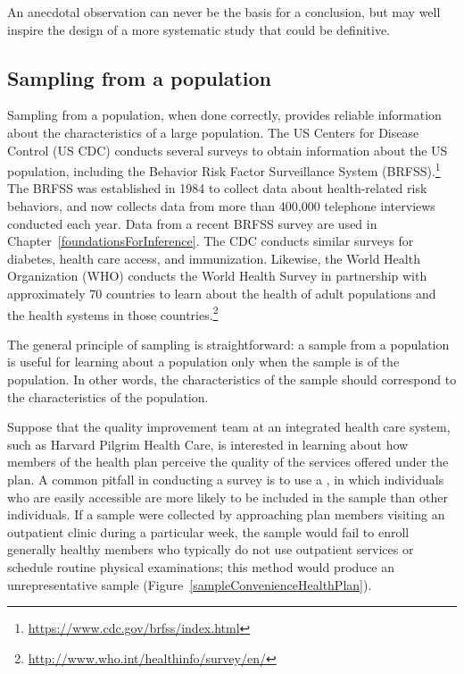 An anecdotal observation can never be the basis for a conclusion, but may well inspire the design of a more systematic study that could be definitive.  


\subsection{Sampling from a population}

Sampling from a population, when done correctly, provides reliable information about the characteristics of a large population. The US Centers for Disease Control (US CDC) conducts several surveys to obtain information about the US population, including the Behavior Risk Factor Surveillance System (BRFSS).\footnote{\url{https://www.cdc.gov/brfss/index.html}} The BRFSS was established in 1984 to collect data about health-related risk behaviors, and now collects data from more than 400,000 telephone interviews conducted each year. Data from a recent BRFSS survey are used in Chapter~\ref{foundationsForInference}. The CDC conducts similar surveys for diabetes, health care access, and immunization. Likewise, the World Health Organization (WHO) conducts the World Health Survey in partnership  with approximately 70 countries to learn about the health of adult populations and the health systems in those countries.\footnote{\url{http://www.who.int/healthinfo/survey/en/}}  

The general principle of sampling is straightforward: a sample from a population is useful for learning about a population only when the sample is  of the population. In other words, the characteristics of the sample should correspond to the characteristics of the population. 

Suppose that the quality improvement team at an integrated health care system, such as Harvard Pilgrim Health Care, is interested in learning about how members of the health plan perceive the quality of the services offered under the plan. A common pitfall in conducting a survey is to use a , in which individuals who are easily accessible are more likely to be included in the sample than other individuals. If a sample were collected by approaching plan members visiting an outpatient clinic during a particular week, the sample would fail to enroll generally healthy members who typically do not use outpatient services or schedule routine physical examinations; this method would produce an unrepresentative sample (Figure~\ref{sampleConvenienceHealthPlan}). 


